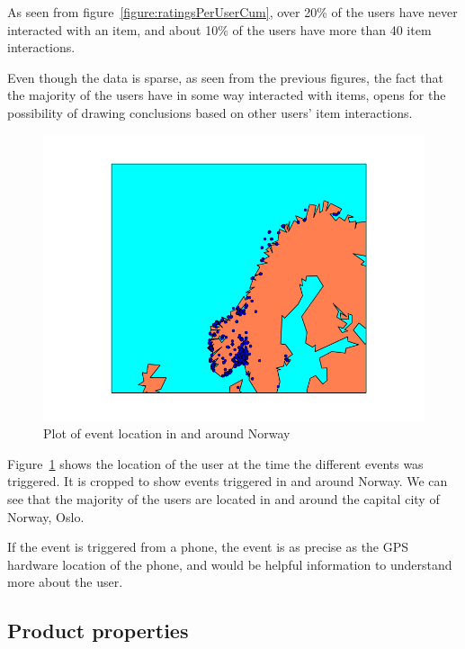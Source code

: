         As seen from figure~\ref{figure:ratingsPerUserCum}, over 20\% of the users have never interacted with an item, and about 10\% of the users have more than 40 item interactions.

        Even though the data is sparse, as seen from the previous figures, the fact that the majority of the users have in some way interacted with items, opens for the possibility of drawing conclusions based on other users' item interactions.

    \begin{figure}[H]
        \includegraphics[width=5in]{image/simpleGeoPlotNorway.png}
        \centering
        \caption{Plot of event location in and around Norway}
    \label{figure:croppedGeoplot}
    \end{figure}
        Figure~\ref{figure:croppedGeoplot} shows the location of the user at the time the different events was triggered.
        It is cropped to show events triggered in and around Norway.
        We can see that the majority of the users are located in and around the capital city of Norway, Oslo.

        If the event is triggered from a phone, the event is as precise as the GPS hardware location of the phone, and would be helpful information to understand more about the user.

\subsection{Product properties}

